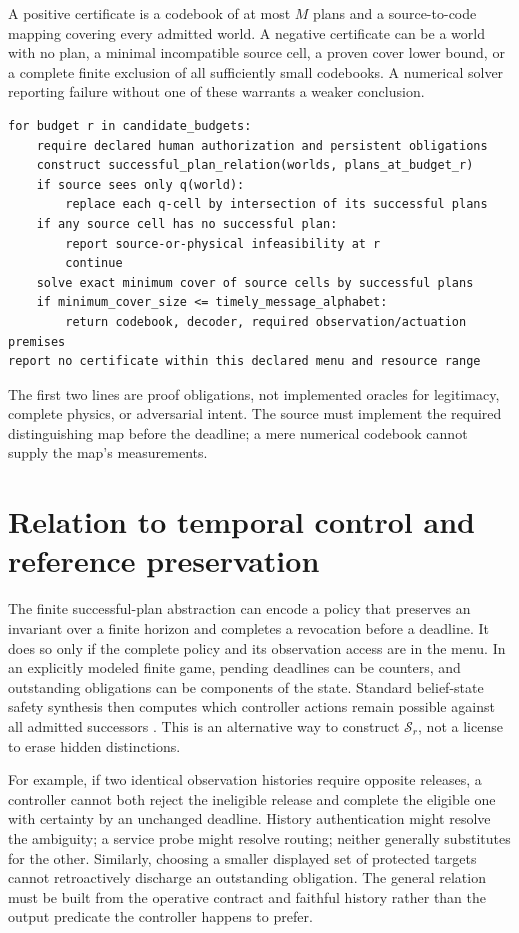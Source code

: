 \documentclass[11pt,a4paper]{article}
\theoremstyle{definition}\newtheorem{definition}{Definition}
\newcommand{\Succ}{\mathcal S}
\begin{document}
A positive certificate is a codebook of at most $M$ plans and a source-to-code mapping covering every admitted world. A negative certificate can be a world with no plan, a minimal incompatible source cell, a proven cover lower bound, or a complete finite exclusion of all sufficiently small codebooks. A numerical solver reporting failure without one of these warrants a weaker conclusion.

\begin{lstlisting}[caption={Specification-level evidence and resource check.}]
for budget r in candidate_budgets:
    require declared human authorization and persistent obligations
    construct successful_plan_relation(worlds, plans_at_budget_r)
    if source sees only q(world):
        replace each q-cell by intersection of its successful plans
    if any source cell has no successful plan:
        report source-or-physical infeasibility at r
        continue
    solve exact minimum cover of source cells by successful plans
    if minimum_cover_size <= timely_message_alphabet:
        return codebook, decoder, required observation/actuation premises
report no certificate within this declared menu and resource range
\end{lstlisting}
The first two lines are proof obligations, not implemented oracles for legitimacy, complete physics, or adversarial intent. The source must implement the required distinguishing map before the deadline; a mere numerical codebook cannot supply the map's measurements.

\section{Relation to temporal control and reference preservation}
The finite successful-plan abstraction can encode a policy that preserves an invariant over a finite horizon and completes a revocation before a deadline. It does so only if the complete policy and its observation access are in the menu. In an explicitly modeled finite game, pending deadlines can be counters, and outstanding obligations can be components of the state. Standard belief-state safety synthesis then computes which controller actions remain possible against all admitted successors \cite{chatterjee,liu3}. This is an alternative way to construct $\Succ_r$, not a license to erase hidden distinctions.

For example, if two identical observation histories require opposite releases, a controller cannot both reject the ineligible release and complete the eligible one with certainty by an unchanged deadline. History authentication might resolve the ambiguity; a service probe might resolve routing; neither generally substitutes for the other. Similarly, choosing a smaller displayed set of protected targets cannot retroactively discharge an outstanding obligation. The general relation must be built from the operative contract and faithful history rather than the output predicate the controller happens to prefer.
\end{document}
